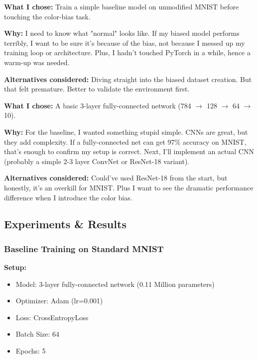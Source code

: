 \documentclass[9pt,a4paper,twocolumn,twoside]{tau-class/tau}
\begin{document}
        \begin{tauenv}[frametitle=Decision: Start with Vanilla MNIST First]
            \textbf{What I chose:} Train a simple baseline model on unmodified MNIST before touching the color-bias task.
            
            \textbf{Why:} I need to know what "normal" looks like. If my biased model performs terribly, I want to be sure it's because of the bias, not because I messed up my training loop or architecture. Plus, I hadn't touched PyTorch in a while, hence a warm-up was needed.
            
            \textbf{Alternatives considered:} Diving straight into the biased dataset creation. But that felt premature. Better to validate the environment first.
        \end{tauenv}
        
        \begin{tauenv}[frametitle=Decision: Use Simple Fully-Connected Network]
            \textbf{What I chose:} A basic 3-layer fully-connected network (784 $\rightarrow$ 128 $\rightarrow$ 64 $\rightarrow$ 10).
            
            \textbf{Why:} For the baseline, I wanted something stupid simple. CNNs are great, but they add complexity. If a fully-connected net can get 97\% accuracy on MNIST, that's enough to confirm my setup is correct. Next, I'll implement an actual CNN (probably a simple 2-3 layer ConvNet or ResNet-18 variant).
            
            \textbf{Alternatives considered:} Could've used ResNet-18 from the start, but honestly, it's an overkill for MNIST. Plus I want to see the dramatic performance difference when I introduce the color bias.
        \end{tauenv}
        
    \subsection{Experiments \& Results}
    
        \subsubsection{Baseline Training on Standard MNIST}
        
        \textbf{Setup:}
        \begin{itemize}
            \item Model: 3-layer fully-connected network (0.11 Million parameters)
            \item Optimizer: Adam (lr=0.001)
            \item Loss: CrossEntropyLoss
            \item Batch Size: 64
            \item Epochs: 5
        \end{itemize}
        
\end{document}
